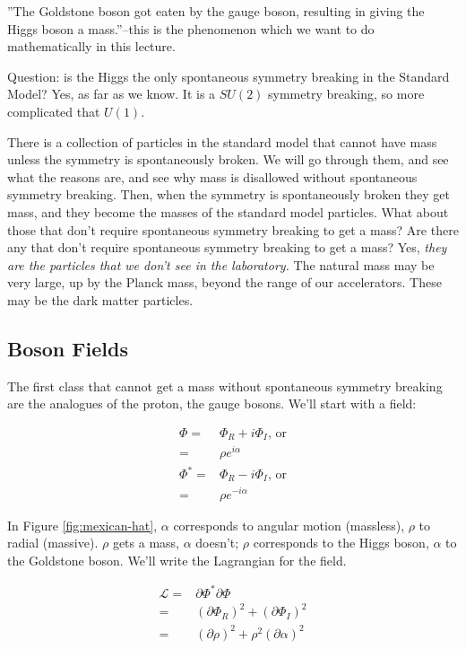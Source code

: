 \documentclass[]{article}
\begin{document}
''The Goldstone boson got eaten by the gauge boson, resulting in giving the Higgs boson a mass.''--this is the phenomenon which we want to do mathematically in this lecture.

Question: is the Higgs the only spontaneous symmetry breaking in the Standard Model? Yes, as far as we know. It is a $SU(2)$ symmetry breaking, so more complicated that $U(1)$.

There is a collection of particles in the standard model that cannot have mass unless the symmetry is spontaneously  broken. We will go through them, and see what the reasons are, and see why mass is disallowed without spontaneous symmetry breaking. Then, when the symmetry is spontaneously  broken they get mass, and they become the masses of the standard model particles. What about those that don't require spontaneous symmetry breaking to get a mass? Are there any that don't require spontaneous symmetry breaking to get a mass? Yes, \emph{they are the particles that we don't see in the laboratory.} The natural mass may be very large, up by the Planck mass, beyond the range of our accelerators. These may be the dark matter particles.

\subsection{Boson Fields}

The first class that cannot get a mass without spontaneous symmetry breaking are the analogues of the proton, the gauge bosons. We'll start with a field:

\begin{align*}
	\Phi =& \Phi_R + i \Phi_I \text{, or}\\
	=& \rho e^{i \alpha}\\
	\Phi^* =& \Phi_R - i \Phi_I \text{, or}\\
	=& \rho e^{-i \alpha}
\end{align*}

In Figure \ref{fig:mexican-hat}, $\alpha$ corresponds to angular motion (massless), $\rho$  to radial (massive). $\rho$ gets a mass,  $\alpha$ doesn't; $\rho$ corresponds to the Higgs boson,  $\alpha$ to the Goldstone boson. We'll write the Lagrangian for the field.

\begin{align*}
	\mathcal{L} =& \partial \Phi^* \partial \Phi \\
	=&(\partial \Phi_R)^2 + (\partial \Phi_I)^2\\
	=& (\partial \rho)^2 + \rho^2 (\partial \alpha)^2 
\end{align*} 
\end{document}
